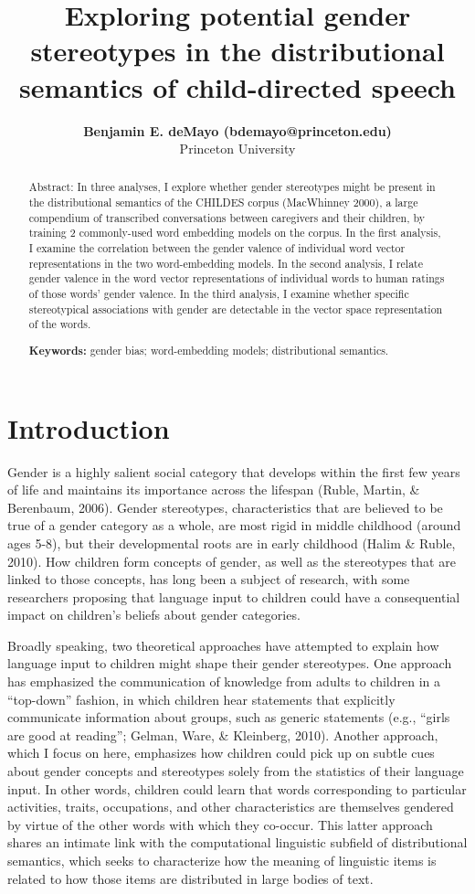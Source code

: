 \documentclass[10pt, letterpaper]{article}
\title{Exploring potential gender stereotypes in the distributional
semantics of child-directed speech}
\author{{\large \bf Benjamin E. deMayo (bdemayo@princeton.edu)} \\ Princeton University}
\begin{document}
\maketitle

\begin{abstract}
Abstract: In three analyses, I explore whether gender stereotypes might
be present in the distributional semantics of the CHILDES corpus
(MacWhinney 2000), a large compendium of transcribed conversations
between caregivers and their children, by training 2 commonly-used word
embedding models on the corpus. In the first analysis, I examine the
correlation between the gender valence of individual word vector
representations in the two word-embedding models. In the second
analysis, I relate gender valence in the word vector representations of
individual words to human ratings of those words' gender valence. In the
third analysis, I examine whether specific stereotypical associations
with gender are detectable in the vector space representation of the
words.

\textbf{Keywords:}
gender bias; word-embedding models; distributional semantics.
\end{abstract}

\hypertarget{introduction}{%
\section{Introduction}\label{introduction}}

Gender is a highly salient social category that develops within the
first few years of life and maintains its importance across the lifespan
(Ruble, Martin, \& Berenbaum, 2006). Gender stereotypes, characteristics
that are believed to be true of a gender category as a whole, are most
rigid in middle childhood (around ages 5-8), but their developmental
roots are in early childhood (Halim \& Ruble, 2010). How children form
concepts of gender, as well as the stereotypes that are linked to those
concepts, has long been a subject of research, with some researchers
proposing that language input to children could have a consequential
impact on children's beliefs about gender categories.

Broadly speaking, two theoretical approaches have attempted to explain
how language input to children might shape their gender stereotypes. One
approach has emphasized the communication of knowledge from adults to
children in a ``top-down'' fashion, in which children hear statements
that explicitly communicate information about groups, such as generic
statements (e.g., {``girls are good at reading''}; Gelman, Ware, \&
Kleinberg, 2010). Another approach, which I focus on here, emphasizes
how children could pick up on subtle cues about gender concepts and
stereotypes solely from the statistics of their language input. In other
words, children could learn that words corresponding to particular
activities, traits, occupations, and other characteristics are
themselves gendered by virtue of the other words with which they
co-occur. This latter approach shares an intimate link with the
computational linguistic subfield of distributional semantics, which
seeks to characterize how the meaning of linguistic items is related to
how those items are distributed in large bodies of text.
\end{document}
